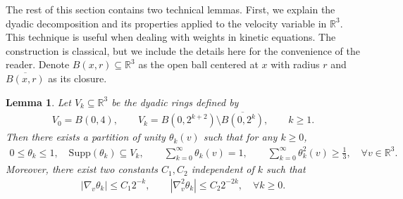 \documentclass[11pt,american, reqno]{amsart}
\numberwithin{equation}{section}
\newtheorem{lemma}[theorem]{Lemma}
\newcommand{\R}{\mathbb R}
\newcommand{\1}{\mathds{1}}
\newcommand{\abs}[1]{\left\vert#1\right\vert}
\numberwithin{equation}{section}
\begin{document}
The rest of this section contains two technical lemmas. 
First, we explain the dyadic decomposition and its properties applied to the velocity variable in $\R^3$. This technique is useful when dealing with weights in kinetic equations. The construction is classical, but we include the details here for the convenience of the reader. Denote $B(x, r) \subseteq \R^3$ as the open ball centered at $x$ with radius $r$ and $\overline {B(x, r)}$ as its closure. 

\begin{lemma} \label{lem:dyadic}
Let $V_k \subseteq \R^3$ be the dyadic rings defined by
\begin{align*}
 V_0 = B(0, 4),
\qquad 
 V_k = B(0, 2^{k+2}) \setminus \overline{B(0, 2^{k})}, 
\qquad 
 k \geq 1.
\end{align*}
Then there exists a partition of unity $\theta_k(v)$ such that for any $k \geq 0$,
\begin{align} \label{cond:theta-k-1}
 0 \leq \theta_k \leq 1, 
\quad
\text{Supp}(\theta_k) \subseteq V_k,
\qquad
\sum_{k=0}^\infty \theta_k (v) = 1, 
\qquad
\sum_{k=0}^\infty \theta_k^2 (v) \geq  \frac{1}{3}, 
\quad \forall v \in \R^3.
\end{align}
Moreover, there exist two constants $C_1, C_2$ independent of $k$ such that
\begin{align}
\label{cond:theta-k-2}
 \abs{\nabla_v \theta_k}
\leq  
 C_1 2^{-k},
\qquad
 \abs{\nabla_v^2 \theta_k}
\leq  
 C_2 2^{-2k},
\quad  
 \forall k \geq 0. 
\end{align}
\end{lemma}
\end{document}
